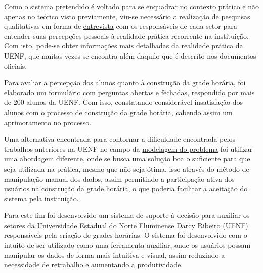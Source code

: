 
Como o sistema pretendido é voltado para se enquadrar no contexto prático e não apenas no teórico visto previamente, viu-se necessário a realização de pesquisas qualitativas em forma de \hyperref[sec:entrevistas]{entrevista} com os responsáveis de cada setor para entender suas percepções pessoais à realidade prática recorrente na instituição. Com isto, pode-se obter informações mais detalhadas da realidade prática da UENF, que muitas vezes se encontra além daquilo que é descrito nos documentos oficiais.


Para avaliar a percepção dos alunos quanto à construção da grade horária, foi elaborado um \hyperref[sec:formulario]{formulário} com perguntas abertas e fechadas, respondido por mais de 200 alunos da UENF. Com isso, constatando considerável insatisfação dos alunos com o processo de construção da grade horária, cabendo assim um aprimoramento no processo.


Uma alternativa encontrada para contornar a dificuldade encontrada pelos trabalhos anteriores na UENF no campo da \hyperref[chap:modelagem]{modelagem do problema} foi utilizar uma abordagem diferente, onde se busca uma solução boa o suficiente para que seja utilizada na prática, mesmo que não seja ótima, isso através do método de manipulação manual dos dados, assim permitindo a participação ativa dos usuários na construção da grade horária, o que poderia facilitar a aceitação do sistema pela instituição.


Para este fim foi \hyperref[chap:desenvolvimento]{desenvolvido um sistema de suporte à decisão} para auxiliar os setores da Universidade Estadual do Norte Fluminense Darcy Ribeiro (UENF) responsáveis pela criação de grades horárias. O sistema foi desenvolvido com o intuito de ser utilizado como uma ferramenta auxiliar, onde os usuários possam manipular os dados de forma mais intuitiva e visual, assim reduzindo a necessidade de retrabalho e aumentando a produtividade.

